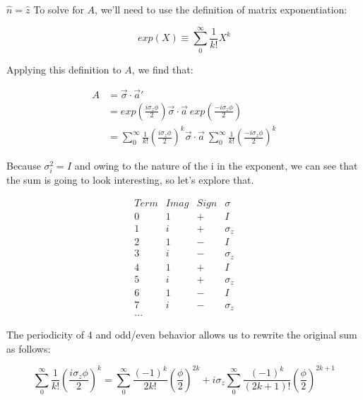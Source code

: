 \begin{answer}
\begin{answerpart}{\texorpdfstring{$\hat{n} = \hat{z}$}{n = z}}
    To solve for $A$, we'll need to use the definition of matrix
    exponentiation:

    \begin{equation}
      exp(X) \equiv \sum_{0}^{\infty} \frac{1}{k!} X^k
    \end{equation}

    Applying this definition to $A$, we find that:

    \begin{equation}
      \begin{split}
        A &=
        \vec{\sigma} \cdot \vec{a}' \\
        &= exp \left( \frac{i\sigma_z\phi}{2}\right)
        \vec{\sigma} \cdot \vec{a} \ 
        exp \left( \frac{-i\sigma_z\phi}{2}\right)\\
        &= \sum_{0}^{\infty}{\frac{1}{k!}\left(\frac{i\sigma_z\phi}{2}\right)^k}
        \vec{\sigma} \cdot \vec{a} \
        \sum_{0}^{\infty}{\frac{1}{k!}\left(\frac{-i\sigma_z\phi}{2}\right)^k}
      \end{split}
    \end{equation}

    Because $\sigma_i^2 = I$ and owing to the nature of the i in the
    exponent, we can see that the sum is going to look interesting, so
    let's explore that.

    \begin{equation}
      \begin{array}{ccccc}
        Term & Imag & Sign & \sigma \\
        \hline
        0 & 1 & + & I \\
        1 & i & + & \sigma_z \\
        2 & 1 & - & I \\
        3 & i & - & \sigma_z \\
        \hline
        4 & 1 & + & I \\
        5 & i & + & \sigma_z \\
        6 & 1 & - & I \\
        7 & i & - & \sigma_z \\
        \hline
        ...
      \end{array}
    \end{equation}

    The periodicity of 4 and odd/even behavior allows us to rewrite the
    original sum as follows:

    \begin{equation}
      \sum_{0}^{\infty}{\frac{1}{k!}\left(\frac{i\sigma_z\phi}{2}\right)^k}
      = \sum_{0}^{\infty}{\frac{(-1)^k}{2k!}\left(\frac{\phi}{2}\right)^{2k}}
      + i\sigma_z\sum_{0}^{\infty}{\frac{(-1)^k}{(2k+1)!}\left(\frac{\phi}{2}\right)^{2k+1}}
    \end{equation}


\end{answerpart}
\end{answer}

